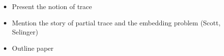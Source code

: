 \begin{itemize}
	\item Present the notion of trace
	\item Mention the story of partial trace and the embedding problem (Scott, Selinger)
	\item Outline paper
\end{itemize}


